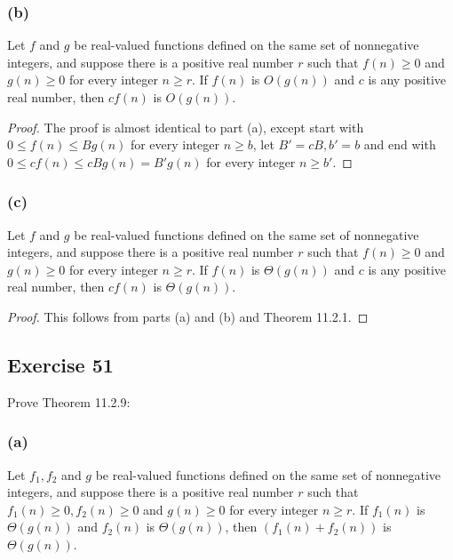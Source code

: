 \documentclass[14pt]{extarticle}
\begin{document}
\subsubsection{(b)}
Let \(f\) and \(g\) be real-valued functions defined on the same set of nonnegative integers, and suppose there is a 
positive real number \(r\) such that \(f(n) \geq 0\) and \(g(n) \geq 0\) for every integer \(n \geq r\). If \(f(n)\) is 
\(O(g(n))\) and \(c\) is any positive real number, then \(cf(n)\) is \(O(g(n))\).

\begin{proof}
The proof is almost identical to part (a), except start with \(0 \leq f(n) \leq Bg(n)\) for every integer \(n \geq b\), let 
\(B' = cB, b' = b\) and end with \(0 \leq cf(n) \leq cBg(n) = B'g(n)\) for every integer \(n \geq b'\).
\end{proof}

\subsubsection{(c)}
Let \(f\) and \(g\) be real-valued functions defined on the same set of nonnegative integers, and suppose there is a 
positive real number \(r\) such that \(f(n) \geq 0\) and \(g(n) \geq 0\) for every integer \(n \geq r\). If \(f(n)\) is 
\(\Theta(g(n))\) and \(c\) is any positive real number, then \(cf(n)\) is \(\Theta(g(n))\).

\begin{proof}
This follows from parts (a) and (b) and Theorem 11.2.1.
\end{proof}

\subsection{Exercise 51}
Prove Theorem 11.2.9:

\subsubsection{(a)}
Let \(f_1, f_2\) and \(g\) be real-valued functions defined on the same set of nonnegative integers, and suppose there is a 
positive real number \(r\) such that \(f_1(n) \geq 0, f_2(n) \geq 0\) and \(g(n) \geq 0\) for every integer \(n \geq r\). 
If \(f_1(n)\) is \(\Theta(g(n))\) and \(f_2(n)\) is \(\Theta (g(n))\), then \((f_1(n) + f_2(n))\) is \(\Theta(g(n))\).
\end{document}

